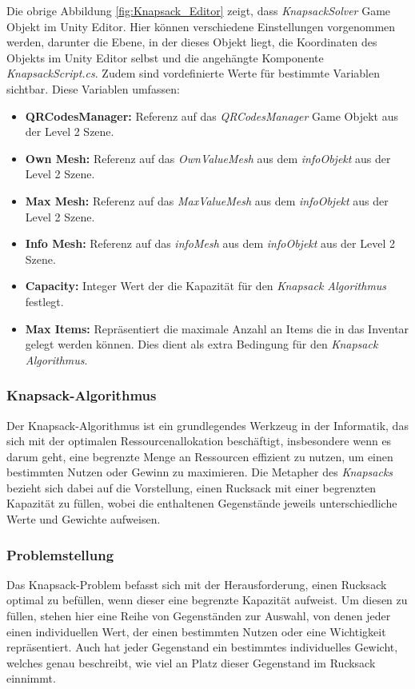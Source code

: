 Die obrige Abbildung \ref{fig:Knapsack_Editor} zeigt, dass \textit{KnapsackSolver} Game Objekt im Unity Editor. Hier können verschiedene
Einstellungen vorgenommen werden, darunter die Ebene, in der dieses Objekt liegt, die Koordinaten des Objekts im
Unity Editor selbst und die angehängte Komponente \textit{KnapsackScript.cs}. Zudem sind vordefinierte Werte für
bestimmte Variablen sichtbar. Diese Variablen umfassen:

\begin{itemize}
\item \textbf{QRCodesManager:} Referenz auf das \textit{QRCodesManager} Game Objekt aus der Level 2 Szene.
\item \textbf{Own Mesh:} Referenz auf das \textit{OwnValueMesh} aus dem \textit{infoObjekt} aus der Level 2 Szene.
\item \textbf{Max Mesh:} Referenz auf das \textit{MaxValueMesh} aus dem \textit{infoObjekt} aus der Level 2 Szene.
\item \textbf{Info Mesh:} Referenz auf das \textit{infoMesh} aus dem \textit{infoObjekt} aus der Level 2 Szene.
\item \textbf{Capacity:} Integer Wert der die Kapazität für den \textit{Knapsack Algorithmus} festlegt.
\item \textbf{Max Items:} Repräsentiert die maximale Anzahl an Items die in das Inventar gelegt werden können. Dies
dient als extra Bedingung für den \textit{Knapsack Algorithmus}.\\
\end{itemize}

\subsubsection{Knapsack-Algorithmus}
Der Knapsack-Algorithmus ist ein grundlegendes Werkzeug in der Informatik, das sich mit der optimalen Ressourcenallokation
beschäftigt, insbesondere wenn es darum geht, eine begrenzte Menge an Ressourcen effizient zu nutzen, um einen bestimmten
Nutzen oder Gewinn zu maximieren. Die Metapher des \textit{Knapsacks} bezieht sich dabei auf die Vorstellung, einen Rucksack
mit einer begrenzten Kapazität zu füllen, wobei die enthaltenen Gegenstände jeweils unterschiedliche Werte und Gewichte aufweisen.

\subsubsection{Problemstellung}
Das Knapsack-Problem befasst sich mit der Herausforderung, einen Rucksack optimal zu befüllen, wenn dieser eine begrenzte
Kapazität aufweist. Um diesen zu füllen, stehen hier eine Reihe von Gegenständen zur Auswahl, von denen jeder einen
individuellen Wert, der einen bestimmten Nutzen oder eine Wichtigkeit repräsentiert. Auch hat jeder Gegenstand ein
bestimmtes individuelles Gewicht, welches genau beschreibt, wie viel an Platz dieser Gegenstand im Rucksack einnimmt.

